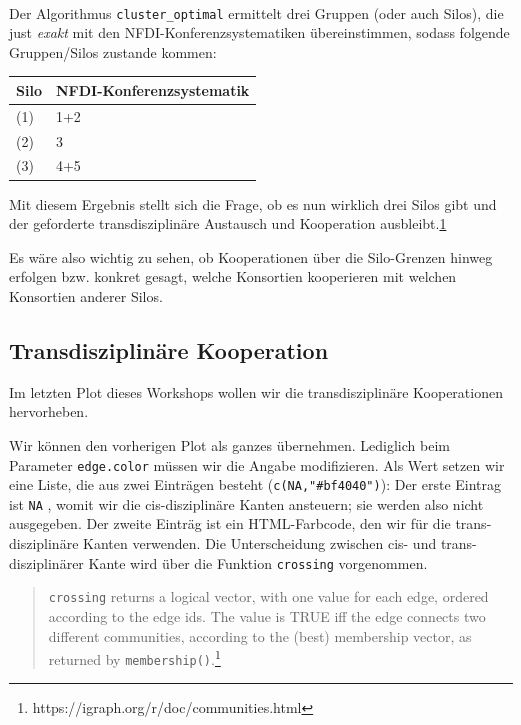 \documentclass[11pt]{article}
\begin{document}
    \begin{center}
    \end{center}
    { \hspace*{\fill} \\}
    
    Der Algorithmus \texttt{cluster\_optimal} ermittelt drei Gruppen (oder
auch Silos), die just \emph{exakt} mit den NFDI-Konferenzsystematiken
übereinstimmen, sodass folgende Gruppen/Silos zustande kommen:

\begin{longtable}[]{@{}ll@{}}
\toprule
Silo & NFDI-Konferenzsystematik\tabularnewline
\midrule
\endhead
(1) & 1+2\tabularnewline
(2) & 3\tabularnewline
(3) & 4+5\tabularnewline
\bottomrule
\end{longtable}

Mit diesem Ergebnis stellt sich die Frage, ob es nun wirklich drei Silos
gibt und der geforderte transdisziplinäre Austausch und Kooperation
ausbleibt.\href{https://www.youtube.com/watch?v=YmuUT8HkXxY\&feature=youtu.be\&t=904}{1}

Es wäre also wichtig zu sehen, ob Kooperationen über die Silo-Grenzen
hinweg erfolgen bzw. konkret gesagt, welche Konsortien kooperieren mit
welchen Konsortien anderer Silos.

    \hypertarget{transdisziplinuxe4re-kooperation}{%
\subsection{Transdisziplinäre
Kooperation}\label{transdisziplinuxe4re-kooperation}}

Im letzten Plot dieses Workshops wollen wir die transdisziplinäre
Kooperationen hervorheben.

Wir können den vorherigen Plot als ganzes übernehmen. Lediglich beim
Parameter \texttt{edge.color} müssen wir die Angabe modifizieren. Als
Wert setzen wir eine Liste, die aus zwei Einträgen besteht
(\texttt{c(NA,"\#bf4040")}): Der erste Eintrag ist \texttt{NA} , womit
wir die cis-disziplinäre Kanten ansteuern; sie werden also nicht
ausgegeben. Der zweite Einträg ist ein HTML-Farbcode, den wir für die
trans-disziplinäre Kanten verwenden. Die Unterscheidung zwischen cis-
und trans-disziplinärer Kante wird über die Funktion \texttt{crossing}
vorgenommen.

\begin{quote}
\texttt{crossing} returns a logical vector, with one value for each
edge, ordered according to the edge ids. The value is TRUE iff the edge
connects two different communities, according to the (best) membership
vector, as returned by \texttt{membership()}.\footnote{https://igraph.org/r/doc/communities.html}
\end{quote}
\end{document}
